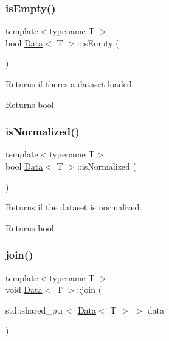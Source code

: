 \subsubsection{\texorpdfstring{is\+Empty()}{isEmpty()}}
{\footnotesize\ttfamily template$<$typename T $>$ \\
bool \hyperlink{class_data}{Data}$<$ T $>$\+::is\+Empty (\begin{DoxyParamCaption}{ }\end{DoxyParamCaption})}



Returns if there\textquotesingle{}s a dataset loaded. 

\begin{DoxyReturn}{Returns}
bool 
\end{DoxyReturn}
\mbox{\label{class_data_a6b91ca6585e8638f1b359a6f2bb827d7}} 
\subsubsection{\texorpdfstring{is\+Normalized()}{isNormalized()}}
{\footnotesize\ttfamily template$<$typename T$>$ \\
bool \hyperlink{class_data}{Data}$<$ T $>$\+::is\+Normalized (\begin{DoxyParamCaption}{ }\end{DoxyParamCaption})\hspace{0.3cm}{\ttfamily [inline]}}



Returns if the dataset is normalized. 

\begin{DoxyReturn}{Returns}
bool 
\end{DoxyReturn}
\mbox{\label{class_data_abf57674d356299c2be916331791e8f12}} 
\subsubsection{\texorpdfstring{join()}{join()}}
{\footnotesize\ttfamily template$<$typename T $>$ \\
void \hyperlink{class_data}{Data}$<$ T $>$\+::join (\begin{DoxyParamCaption}\item[{std\+::shared\+\_\+ptr$<$ \hyperlink{class_data}{Data}$<$ T $>$ $>$}]{data }\end{DoxyParamCaption})}



